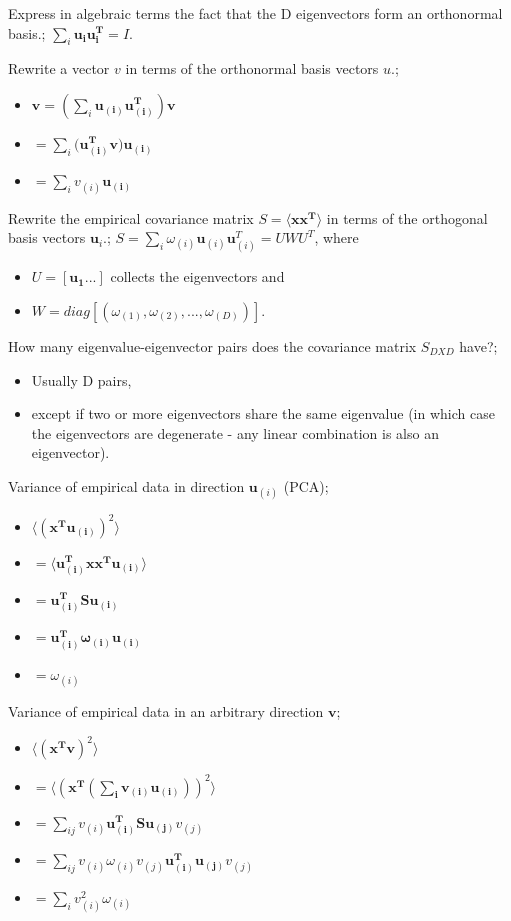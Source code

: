 \documentclass{article}
\begin{document}
Express in algebraic terms the fact that the D eigenvectors form an orthonormal basis.; $\sum_i\mathbf{u_{i}u_{i}^T}=I$.


Rewrite a vector $v$ in terms of the orthonormal basis vectors $u$.; \begin{itemize}
	\item $\mathbf{v}=(\sum_i \mathbf{u_{(i)}u_{(i)}^T})\mathbf{v}$
	\item $=\sum_i (\mathbf{u_{(i)}^Tv)u_{(i)}}$
	\item $=\sum_i v_{(i)}\mathbf{u_{(i)}}$
	\end{itemize}

Rewrite the empirical covariance matrix $S=\langle \mathbf{xx^T} \rangle$ in terms of the orthogonal basis vectors $\mathbf{u}_i$.; $S=\sum_i \omega_{(i)}\mathbf{u}_{(i)}\mathbf{u}_{(i)}^T = UWU^T$, where \begin{itemize}
	\item $U=[\mathbf{u_{1}}...]$ collects the eigenvectors and
	\item $W = diag[(\omega_{(1)}, \omega_{(2)},...,\omega_{(D)})]$.
\end{itemize}

How many eigenvalue-eigenvector pairs does the covariance matrix $S_{DXD}$ have?; \begin{itemize}
	\item Usually D pairs,
	\item except if two or more eigenvectors share the same eigenvalue (in which case the eigenvectors are degenerate - any linear combination is also an eigenvector).
\end{itemize}

Variance of empirical data in direction $\mathbf{u}_{(i)}$ (PCA); \begin{itemize}
	\item $\langle (\mathbf{x^Tu_{(i)}})^2\rangle $
	\item $= \langle \mathbf{u_{(i)}^Txx^Tu_{(i)}}\rangle $
	\item $=\mathbf{u_{(i)}^TSu_{(i)}}$
\item $=\mathbf{u_{(i)}^T\omega_{(i)}u_{(i)}}$
\item $=\omega_{(i)}$
\end{itemize}

Variance of empirical data in an arbitrary direction $\mathbf{v}$; \begin{itemize}
	\item $\langle (\mathbf{x^Tv})^2\rangle $
	\item $= \langle (\mathbf{x^T(\sum_i v_{(i)}\mathbf{u}_{(i)})})^2\rangle $
	\item $=\sum_{ij}v_{(i)}\mathbf{u_{(i)}^TSu_{(j)}}v_{(j)}$
	\item $=\sum_{ij}v_{(i)}\omega_{(i)}v_{(j)}\mathbf{u_{(i)}^Tu_{(j)}}v_{(j)}$
	\item $=\sum_i v_{(i)}^2\omega_{(i)}$
\end{itemize}
\end{document}
